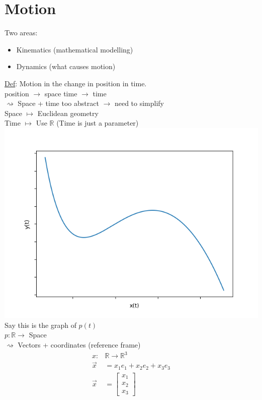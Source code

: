 \documentclass[a4paper,12pt]{article}
\begin{document}
\section*{Motion}
Two areas:
\begin{itemize}
	\item Kinematics (mathematical modelling) 
	\item Dynamics (what causes motion)
\end{itemize}
\underline{Def}: Motion in the change in position in time. \\
position $\rightarrow$ space \hspace{2cm} time $\rightarrow$ time \\
$\rightsquigarrow$ Space + time too abstract $\rightarrow$ need to simplify \\
Space $\mapsto$ Euclidean geometry \\
Time $\mapsto$ Use $\mathbb{R}$ (Time is just a parameter) \\
\includegraphics[scale=0.4]{example_curve} \\
Say this is the graph of $p(t)$ \\
$p: \mathbb{R} \rightarrow$ Space \\
$\rightsquigarrow$ Vectors + coordinates (reference frame) \\
\begin{align*}
	x: & \mathbb{R} \rightarrow \mathbb{R}^3 \\
	\vec{x} & = x_1e_1 + x_2e_2 + x_3e_3 \\
	\vec{x} & = \begin{bmatrix} x_1 \\ x_2 \\ x_3 \end{bmatrix}
\end{align*}
\end{document}
